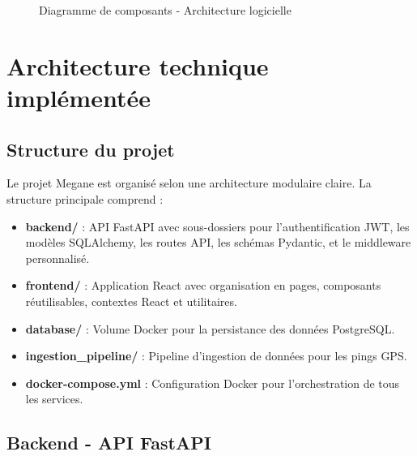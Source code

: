 \documentclass[a4paper, 12pt]{book}
\begin{document}
\begin{figure}[H]
{%
}
\caption{Diagramme de composants - Architecture logicielle}
\label{fig:components}
\end{figure}

\section{Architecture technique implémentée}

\subsection{Structure du projet}

Le projet Megane est organisé selon une architecture modulaire claire. La structure principale comprend :

\begin{itemize}
    \item \textbf{backend/} : API FastAPI avec sous-dossiers pour l'authentification JWT, les modèles SQLAlchemy, les routes API, les schémas Pydantic, et le middleware personnalisé.
    \item \textbf{frontend/} : Application React avec organisation en pages, composants réutilisables, contextes React et utilitaires.
    \item \textbf{database/} : Volume Docker pour la persistance des données PostgreSQL.
    \item \textbf{ingestion\_pipeline/} : Pipeline d'ingestion de données pour les pings GPS.
    \item \textbf{docker-compose.yml} : Configuration Docker pour l'orchestration de tous les services.
\end{itemize}

\subsection{Backend - API FastAPI}
\end{document}
